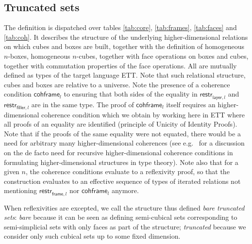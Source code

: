 \documentclass[10pt]{art}
\newcommand{\sort}[1]{\ensuremath{\mathsf{U}_{#1}}}
\newcommand{\unittype}{\ensuremath{\mathsf{unit}}}
\newcommand{\defeq}{\ensuremath{\triangleq}}
\newcommand{\X}[2]{\ensuremath{\mathsf{X}_{#1}^{<#2}}}
\newcommand{\Xcomp}[2]{\ensuremath{\mathsf{X}_{#1}^{=#2}}}
\newcommand{\restrf}[2]{\ensuremath{\mathsf{restr}_{\mathsf{frame}, #1}^{#2}}}
\newcommand{\restrl}[2]{\ensuremath{\mathsf{restr}_{\mathsf{layer}, #1}^{#2}}}
\newcommand{\restrc}[2]{\ensuremath{\mathsf{restr}_{\mathsf{filler}, #1}^{#2}}}
\newcommand{\fullframe}[2]{\ensuremath{\mathsf{fullframe}_{#1}^{#2}}}
\newcommand{\cohframe}[2]{\ensuremath{\mathsf{cohframe}_{#1}^{#2}}}
\newcommand{\imp}{\ensuremath{\rightarrow}}
\renewcommand{\D}{\ensuremath{(D)}}
\newcommand{\eqnline}[4]{$#1$ & $#2$ & $#3$ & $#4$ \\}
\newcommand{\mc}[1]{\multicolumn{4}{c}{\textit{#1}} \\\\}
\begin{document}
\subsection{Truncated sets}
The definition is dispatched over tables \ref{tab:core}, \ref{tab:frames}, \ref{tab:faces} and \ref{tab:coh}. It describes the structure of the underlying higher-dimensional relations on which cubes and boxes are built, together with the definition of homogeneous $n$-boxes, homogeneous $n$-cubes, together with face operations on boxes and cubes, together with commutation properties of the face operations. All are mutually defined as types of the target language ETT. Note that such relational structure, cubes and boxes are relative to a universe. Note the presence of a coherence condition $\cohframe{l}{}$ to ensuring that both sides of the equality in $\restrl{l}{}$ and $\restrc{l}{}$ are in the same type. The proof of $\cohframe{l}{}$ itself requires an higher-dimensional coherence condition which we obtain by working here in ETT where all proofs of an equality are identified (principle of Unicity of Identity Proofs). Note that if the proofs of the same equality were not equated, there would be a need for arbitrary many higher-dimensional coherences (see e.g.~\cite{Herbelin15} for a discussion on the de facto need for recursive higher-dimensional coherence conditions in formulating higher-dimensional structures in type theory). Note also that for a given $n$, the coherence conditions evaluate to a reflexivity proof, so that the construction evaluates to an effective sequence of types of iterated relations not mentioning $\restrf{l}{}$ nor $\cohframe{l}{}$ anymore.

When reflexivities are excepted, we call the structure thus defined \emph{bare truncated sets}: \emph{bare} because it can be seen as defining semi-cubical sets corresponding to semi-simplicial sets with only faces as part of the structure; \emph{truncated} because we consider only such cubical sets up to some fixed dimension.

\end{document}
